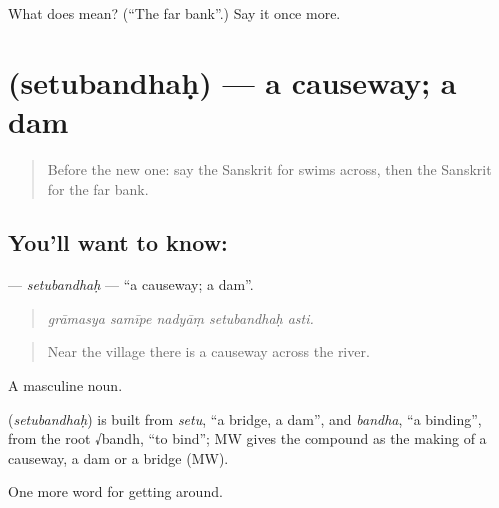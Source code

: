 \begin{tcolorbox}[breakable,colback=teal!4,colframe=teal!35!black,title={Before you move on}]
What does  mean? (\textquotedblleft{}The far bank\textquotedblright{}.) Say it once more.
\end{tcolorbox}
\section[\texorpdfstring{\sk{सेतुबन्धः} (setubandhaḥ)}{सेतुबन्धः (setubandhaḥ)}]{ (setubandhaḥ) — a causeway; a dam}

\label{lesson:SA-C415-setubandhah}



\begin{quote}
Before the new one: say the Sanskrit for swims across, then the Sanskrit for the far bank.
\end{quote}

\subsection*{You'll want to know: }
\textbf{} — \emph{setubandhaḥ} — \textquotedblleft{}a causeway; a dam\textquotedblright{}.

\begin{quote}
    
\end{quote}

\begin{quote}
\emph{grāmasya samīpe nadyāṃ setubandhaḥ asti.}
\end{quote}

\begin{quote}
Near the village there is a causeway across the river.
\end{quote}

A masculine noun.

\begin{cousinweb}
\textbf{} (\emph{setubandhaḥ}) is built from \emph{setu}, \textquotedblleft{}a bridge, a dam\textquotedblright{}, and \emph{bandha}, \textquotedblleft{}a binding\textquotedblright{}, from the root √bandh, \textquotedblleft{}to bind\textquotedblright{}; MW gives the compound as the making of a causeway, a dam or a bridge (MW).
\end{cousinweb}

\begin{grammarlens}[title={What you've built}]
One more word for getting around.
\end{grammarlens}

